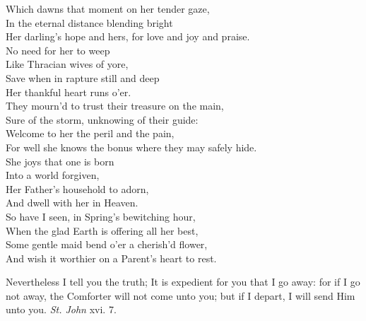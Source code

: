  Which dawns that moment on her tender gaze, \\
 In the eternal distance blending bright \\
 Her darling’s hope and hers, for love and joy and praise. \\
  No need for her to weep \\
 Like Thracian wives of yore, \\
 Save when in rapture still and deep \\
 Her thankful heart runs o’er. \\
 They mourn’d to trust their treasure on the main, \\
 Sure of the storm, unknowing of their guide: \\
 Welcome to her the peril and the pain, \\
 For well she knows the bonus where they may safely hide. \\
  She joys that one is born \\
 Into a world forgiven, \\
 Her Father’s household to adorn, \\
 And dwell with her in Heaven. \\
 So have I seen, in Spring’s bewitching hour, \\
 When the glad Earth is offering all her best, \\
 Some gentle maid bend o’er a cherish’d flower, \\
 And wish it worthier on a Parent’s heart to rest.\\


Nevertheless I tell you the truth; It is expedient for you that I go away: for if I go not away, the Comforter will not come unto you; but if I depart, I will send Him unto you. \emph{St. John} xvi. 7.

